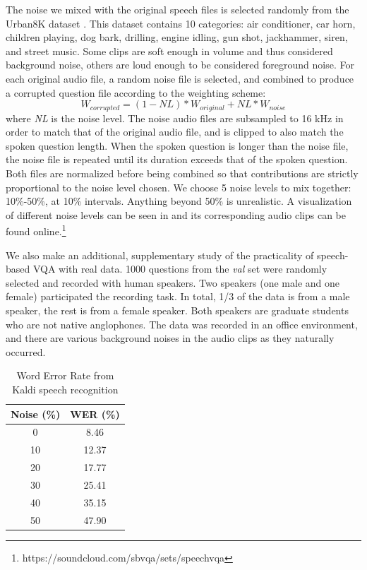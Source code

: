 \documentclass[letterpaper]{article} %
\begin{document}
The noise we mixed with the original speech files is selected randomly from the Urban8K dataset \cite{urban8k}. This dataset contains 10 categories: air conditioner, car horn, children playing, dog bark, drilling, engine idling, gun shot, jackhammer, siren, and street music. Some clips are soft enough in volume and thus considered background noise, others are loud enough to be considered foreground noise. For each original audio file, a random noise file is selected, and combined to produce a corrupted question file according to the weighting scheme:
\begin{displaymath}
  W_{corrupted} = (1-\mathit{NL})*W_{original}  + \mathit{NL}*W_{noise}
\end{displaymath}
where \textit{NL} is the noise level. The noise audio files are subsampled to 16 kHz in order to match that of the original audio file, and is clipped to also match the spoken question length. When the spoken question is longer than the noise file, the noise file is repeated until its duration exceeds that of the spoken question. Both files are normalized before being combined so that contributions are strictly proportional to the noise level chosen. We choose 5 noise levels to mix together: 10\%-50\%, at 10\% intervals. Anything beyond 50\% is unrealistic. A visualization of different noise levels can be seen in  and its corresponding audio clips can be found online.\footnote{https://soundcloud.com/sbvqa/sets/speechvqa}

We also make an additional, supplementary study of the practicality of speech-based VQA with real data. 1000 questions from the \textit{val} set were randomly selected and recorded with human speakers. Two speakers (one male and one female) participated the recording task. In total, 1/3 of the data is from a male speaker, the rest is from a female speaker. Both speakers are graduate students who are not native anglophones. The data was recorded in an office environment, and there are various background noises in the audio clips as they naturally occurred.


\begin{table}[t]
\centering
\caption{Word Error Rate from Kaldi speech recognition}
\label{table:wer}
\begin{tabular}{c|c}
Noise (\%)   & WER (\%) \\ \hline
0  & 8.46  \\
10 & 12.37 \\
20 & 17.77 \\
30 & 25.41 \\
40 & 35.15 \\
50 & 47.90
\end{tabular}
\end{table}
\end{document}
